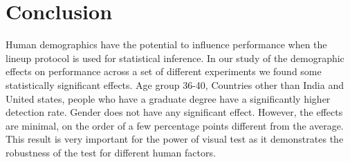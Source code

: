 \documentclass[10pt]{article}\usepackage[]{graphicx}\usepackage[]{color}
\begin{document}
%
%




\section{Conclusion}

Human demographics have the potential to influence performance when the lineup protocol is used for statistical inference. In our study of the demographic effects on performance across a set of different experiments we found some statistically significant effects. Age group 36-40, Countries other than India and United states, people who have a graduate degree have a significantly higher detection rate.  Gender does not have any significant effect. However, the effects are minimal, on the order of a few percentage points different from the average. This result is very important for the power of visual test as it demonstrates the robustness of the test for different human factors.
\end{document}
